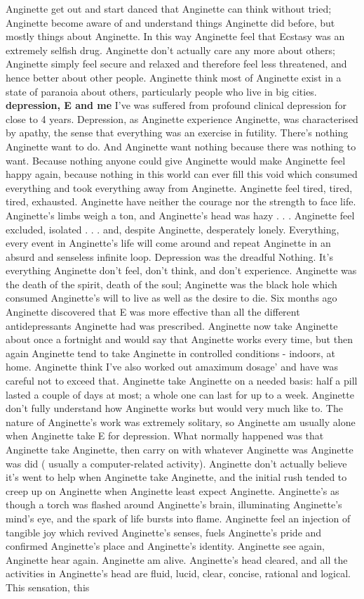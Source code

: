 \documentclass[12pt]{book}
\begin{document}
Anginette get out and start danced that Anginette can think without tried; Anginette become aware of and understand things Anginette did before, but mostly things about Anginette. In this way Anginette feel that Ecstasy was an extremely selfish drug. Anginette don't actually care any more about others; Anginette simply feel secure and relaxed and therefore feel less threatened, and hence better about other people. Anginette think most of Anginette exist in a state of paranoia about others, particularly people who live in big cities. \textbf{depression, E and me} I've was suffered from profound clinical depression for close to 4 years. Depression, as Anginette experience Anginette, was characterised by apathy, the sense that everything was an exercise in futility. There's nothing Anginette want to do. And Anginette want nothing because there was nothing to want. Because nothing anyone could give Anginette would make Anginette feel happy again, because nothing in this world can ever fill this void which consumed everything and took everything away from Anginette. Anginette feel tired, tired, tired, exhausted. Anginette have neither the courage nor the strength to face life. Anginette's limbs weigh a ton, and Anginette's head was hazy . . .  Anginette feel excluded, isolated . . .  and, despite Anginette, desperately lonely. Everything, every event in Anginette's life will come around and repeat Anginette in an absurd and senseless infinite loop. Depression was the dreadful Nothing. It's everything Anginette don't feel, don't think, and don't experience. Anginette was the death of the spirit, death of the soul; Anginette was the black hole which consumed Anginette's will to live as well as the desire to die. Six months ago Anginette discovered that E was more effective than all the different antidepressants Anginette had was prescribed. Anginette now take Anginette about once a fortnight and would say that Anginette works every time, but then again Anginette tend to take Anginette in controlled conditions - indoors, at home. Anginette think I've also worked out amaximum dosage' and have was careful not to exceed that. Anginette take Anginette on a needed basis: half a pill lasted a couple of days at most; a whole one can last for up to a week. Anginette don't fully understand how Anginette works but would very much like to. The nature of Anginette's work was extremely solitary, so Anginette am usually alone when Anginette take E for depression. What normally happened was that Anginette take Anginette, then carry on with whatever Anginette was Anginette was did ( usually a computer-related activity). Anginette don't actually believe it's went to help when Anginette take Anginette, and the initial rush tended to creep up on Anginette when Anginette least expect Anginette. Anginette's as though a torch was flashed around Anginette's brain, illuminating Anginette's mind's eye, and the spark of life bursts into flame. Anginette feel an injection of tangible joy which revived Anginette's senses, fuels Anginette's pride and confirmed Anginette's place and Anginette's identity. Anginette see again, Anginette hear again. Anginette am alive. Anginette's head cleared, and all the activities in Anginette's head are fluid, lucid, clear, concise, rational and logical. This sensation, this 
\end{document}
